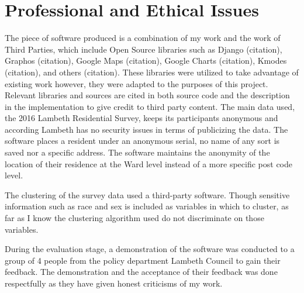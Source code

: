 \chapter{Professional and Ethical Issues} \label{ch:professionalissues}

The piece of software produced is a combination of my work and the work of Third Parties, which include Open Source libraries such as Django (citation), Graphos (citation), Google Maps (citation), Google Charts (citation), Kmodes (citation), and others (citation). These libraries were utilized to take advantage of existing work however, they were adapted to the purposes of this project. Relevant libraries and sources are cited in both source code and the description in the implementation to give credit to third party content.
The main data used, the 2016 Lambeth Residential Survey, keeps its participants anonymous and according Lambeth has no security issues in terms of publicizing the data. The software places a resident under an anonymous serial, no name of any sort is saved nor a specific address. The software maintains the anonymity of the location of their residence at the Ward level instead of a more specific post code level.\par

The clustering of the survey data used a third-party software. Though sensitive information such as race and sex is included as variables in which to cluster, as far as I know the clustering algorithm used do not discriminate on those variables. \par

During the evaluation stage, a demonstration of the software was conducted to a group of 4 people from the policy department Lambeth Council to gain their feedback. The demonstration and the acceptance of their feedback was done respectfully as they have given honest criticisms of my work. \par
